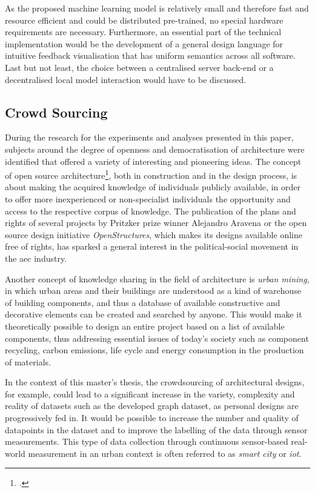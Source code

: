 \documentclass[a4paper, 12pt]{report}
\begin{document}
As the proposed machine learning model is relatively small and therefore fast and resource efficient and could be distributed pre-trained, no special hardware requirements are necessary. Furthermore, an essential part of the technical implementation would be the development of a general design language for intuitive feedback visualisation that has uniform semantics across all software. Last but not least, the choice between a centralised server back-end or a decentralised local model interaction would have to be discussed.

\subsection{Crowd Sourcing}\label{subsec:crowd-sourcing}

During the research for the experiments and analyses presented in this paper, subjects around the degree of openness and democratisation of architecture were identified that offered a variety of interesting and pioneering ideas. The concept of \gls{open source} architecture\footcite{postle2019pattern}, both in construction and in the design process, is about making the acquired knowledge of individuals publicly available, in order to offer more inexperienced or non-specialist individuals the opportunity and access to the respective corpus of knowledge. The publication of the plans and rights of several projects by Pritzker prize winner Alejandro Aravena or the \gls{open source} design initiative \textit{OpenStructures}, which makes its designs available online free of rights, has sparked a general interest in the political-social movement in the \acrshort{aec} industry.

Another concept of knowledge sharing in the field of architecture is \textit{urban mining}, in which urban areas and their buildings are understood as a kind of warehouse of building components, and thus a database of available constructive and decorative elements can be created and searched by anyone. This would make it theoretically possible to design an entire project based on a list of available components, thus addressing essential issues of today's society such as component recycling, carbon emissions, life cycle and energy consumption in the production of materials.

In the context of this master's thesis, the crowdsourcing of architectural designs, for example, could lead to a significant increase in the variety, complexity and reality of datasets such as the developed graph dataset, as personal designs are progressively fed in. It would be possible to increase the number and quality of datapoints in the dataset and to improve the labelling of the data through sensor measurements. This type of data collection through continuous sensor-based real-world measurement in an urban context is often referred to as \textit{smart city} or \textit{\acrfull{iot}}.
\end{document}
